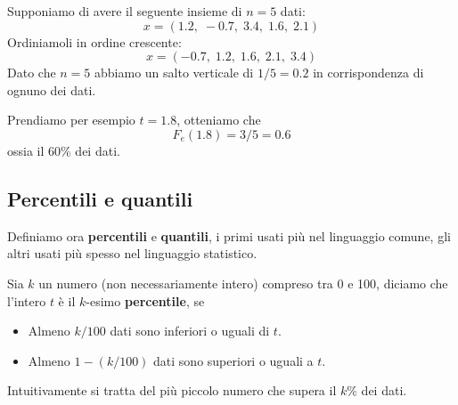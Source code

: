 \begin{example}
	Supponiamo di avere il seguente insieme di $n = 5$ dati:
	\[ x = (1.2, \; -0.7, \; 3.4, \; 1.6, \; 2.1) \]
	Ordiniamoli in ordine crescente:
	\[ x = (-0.7, \; 1.2, \; 1.6, \; 2.1, \; 3.4) \]
	Dato che $n = 5$ abbiamo un salto verticale di $1/5 = 0.2$ in corrispondenza di ognuno dei
	dati.
	\begin{center}
	\end{center}
	Prendiamo per esempio $t = 1.8$, otteniamo che
	\[ F_e(1.8) = 3/5 = 0.6 \]
	ossia il 60\% dei dati.
\end{example}

\subsection{Percentili e quantili}
Definiamo ora \textbf{percentili} e \textbf{quantili}, i primi usati più nel linguaggio comune,
gli altri usati più spesso nel linguaggio statistico.

\begin{definition}
	Sia $k$ un numero (non necessariamente intero) compreso tra 0 e 100, diciamo che l'intero $t$
	è il $k$-esimo
	\textbf{percentile}, se
	\begin{itemize}
		\item Almeno $k / 100$ dati sono inferiori o uguali di $t$.
		\item Almeno $1 - (k / 100)$ dati sono superiori o uguali a $t$.
	\end{itemize}
	Intuitivamente si tratta del più piccolo numero che supera il $k \%$ dei dati.
\end{definition}

